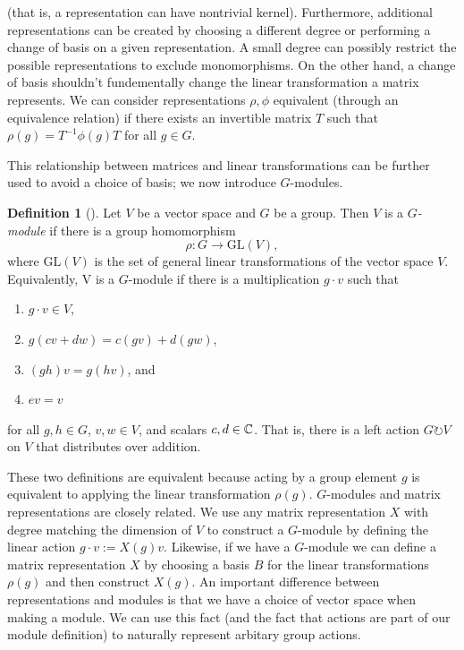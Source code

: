 \documentclass[12pt,twoside]{reedthesis}
\theoremstyle{plain}   %
\theoremstyle{definition}
\newtheorem{defn}{Definition}[section]
\theoremstyle{remark}
\numberwithin{equation}{section}
\def\GL{\mathrm{GL}} \def\SL{\mathrm{SL}}  \def\SP{\mathrm{SL}}\def\OG{\mathrm{O}}
\def\acts{\circlearrowright} %
\begin{document}
  (that is, a representation can have nontrivial kernel).
  Furthermore, additional representations can be created by choosing a different degree or performing a change of basis on a given representation.
  A small degree can possibly restrict the possible representations to exclude monomorphisms.
  On the other hand, a change of basis shouldn't fundementally change the linear transformation a matrix represents.
  We can consider representations $\rho, \phi$ equivalent (through an equivalence relation) if there exists an invertible matrix $T$
  such that $\rho(g) = T^{-1} \phi(g) T$ for all $g \in G$.\par
  This relationship between matrices and linear transformations can be further used to avoid a choice of basis; we now introduce
  $G$-modules.
  \begin{defn}[{\cite[Definition 1.3.1]{sagan}}]
    Let $V$ be a vector space and $G$ be a group. Then $V$ is a \emph{$G$-module} if there is a group homomorphism
    \[\rho: G \to \GL(V),\]
    where $\GL(V)$ is the set of general linear transformations of the vector space $V$.
    Equivalently, V is a $G$-module if there is a multiplication $g \cdot v$ such that
    \begin{enumerate}
    \item $g \cdot v \in V$,
    \item $g(cv + dw) = c(gv) + d(gw)$,
    \item $(gh)v = g(hv)$, and
    \item $ev = v$
    \end{enumerate}
    for all $g,h \in G$, $v,w \in V$, and scalars $c,d \in \mathbb{C}$.
    That is, there is a left action $G \acts V$ on $V$ that distributes over addition.
  \end{defn}
  These two definitions are equivalent because acting by a group element $g$ is equivalent to applying the linear transformation $\rho(g)$.
  $G$-modules and matrix representations are closely related. We use any matrix representation $X$ with degree matching the dimension of $V$
  to construct a $G$-module by defining the linear action $g \cdot v := X(g) v$. Likewise, if we have a $G$-module we can define
  a matrix representation $X$ by choosing a basis $B$ for the linear transformations $\rho(g)$ and then construct $X(g)$.
  An important difference between representations and modules is that we have a choice of vector space when making a module.
  We can use this fact (and the fact that actions are part of our module definition) to naturally represent arbitary group actions.
\end{document}
